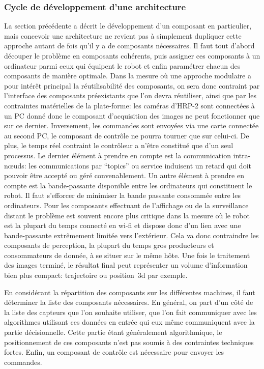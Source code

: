 \subsubsection{Cycle de développement d'une architecture}


La section précédente a décrit le développement d'un composant en
particulier, mais concevoir une architecture ne revient pas à
simplement dupliquer cette approche autant de fois qu'il y a de
composants nécessaires. Il faut tout d'abord découper le problème en
composants cohérents, puis assigner ces composants à un ordinateur
parmi ceux qui équipent le robot et enfin paramétrer chacun des
composants de manière optimale. Dans la mesure où une approche
modulaire a pour intérêt principal la réutilisabilité des composants,
on sera donc contraint par l'interface des composants préexistants que
l'on devra réutiliser, ainsi que par les contraintes matérielles de la
plate-forme: les caméras d'HRP-2 sont connectées à un PC donné donc le
composant d'acquisition des images ne peut fonctionner que sur ce
dernier. Inversement, les commandes sont envoyées via une carte
connectée au second PC, le composant de contrôle ne pourra tourner que
sur celui-ci. De plus, le temps réel contraint le contrôleur a n'être
constitué que d'un seul processus. Le dernier élément à prendre en
compte est la communication intra-n\oe uds: les communications par
``topics'' ou service induisent un retard qui doit pouvoir être
accepté ou géré convenablement. Un autre élément à prendre en compte
est la bande-passante disponible entre les ordinateurs qui constituent
le robot. Il faut s'efforcer de minimiser la bande passante consommée
entre les ordinateurs. Pour les composants effectuant de l'affichage
ou de la surveillance distant le problème est souvent encore plus
critique dans la mesure où le robot est la plupart du temps connecté
en wi-fi et dispose donc d'un lien avec une bande-passante extrêmement
limitée vers l'extérieur. Cela va donc contraindre les
composants de perception, la plupart du temps gros producteurs et
consommateurs de donnée, à se situer sur le même hôte. Une fois le
traitement des images terminé, le résultat final peut représenter un
volume d'information bien plus compact: trajectoire ou position 3d par
exemple.


En considérant la répartition des composants sur les différentes
machines, il faut déterminer la liste des composants nécessaires. En
général, on part d'un côté de la liste des capteurs que l'on souhaite
utiliser, que l'on fait communiquer avec les algorithmes utilisant ces
données en entrée qui eux même communiquent avec la partie
décisionnelle. Cette partie étant généralement algorithmique, le
positionnement de ces composants n'est pas soumis à des contraintes
techniques fortes. Enfin, un composant de contrôle est nécessaire pour
envoyer les commandes.


